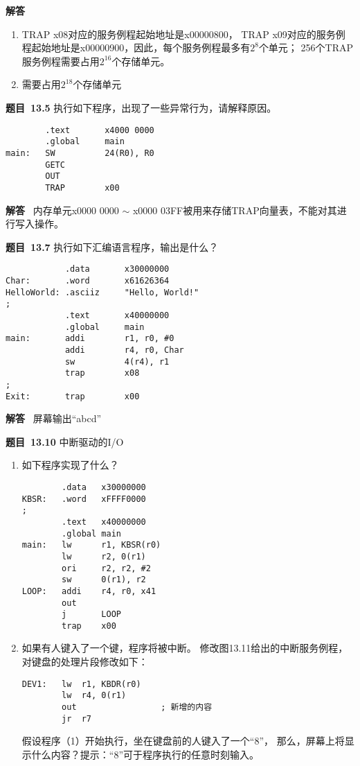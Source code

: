 \documentclass[10pt,a4paper,UTF8]{ctexart}
\newcommand{\problemname}{待定义}
\newenvironment{problem}{\begin{shaded}\par\noindent\textbf{题目\  \problemname}}{\end{shaded}\par}
\newenvironment{solution}{\par\noindent\textbf{解答}\ }{\par}
\begin{document}
\begin{solution}
	\begin{enumerate}[(1)]
		\item TRAP x08对应的服务例程起始地址是x00000800，
		TRAP x09对应的服务例程起始地址是x00000900，因此，每个服务例程最多有$2^8$个单元；
		256个TRAP服务例程需要占用$2^{16}$个存储单元。
		\item 需要占用$2^{18}$个存储单元
	\end{enumerate}
\end{solution}


\renewcommand{\problemname}{13.5}
\begin{problem}
	执行如下程序，出现了一些异常行为，请解释原因。
	\begin{lstlisting}
		.text		x4000 0000 
		.global		main 
main:	SW			24(R0), R0 
		GETC 
		OUT 
		TRAP		x00 	
	\end{lstlisting}
\end{problem}

\begin{solution}
	内存单元x0000 0000 $\sim$ x0000 03FF被用来存储TRAP向量表，不能对其进行写入操作。
\end{solution}


\renewcommand{\problemname}{13.7}
\begin{problem}
	执行如下汇编语言程序，输出是什么？
	\begin{lstlisting}
			.data		x30000000 
Char:		.word		x61626364 
HelloWorld:	.asciiz  	"Hello, World!" 
;		 
			.text		x40000000 
			.global		main 
main:		addi		r1, r0, #0 
			addi		r4, r0, Char 
			sw			4(r4), r1 
			trap		x08 
; 
Exit:		trap		x00 
	\end{lstlisting}
\end{problem}

\begin{solution}
	屏幕输出“abcd”
\end{solution}


\renewcommand{\problemname}{13.10}
\begin{problem}
	中断驱动的I/O
	\begin{enumerate}
		\item 如下程序实现了什么？
		\begin{lstlisting}
		.data	x30000000 
KBSR:	.word	xFFFF0000 
; 
		.text	x40000000 
		.global	main 
main:	lw		r1, KBSR(r0) 
		lw		r2, 0(r1) 
		ori		r2, r2, #2 
		sw		0(r1), r2 
LOOP:	addi	r4, r0, x41 
		out 
		j		LOOP 
		trap	x00 
		\end{lstlisting}
		\item 如果有人键入了一个键，程序将被中断。
		修改图13.11给出的中断服务例程，对键盘的处理片段修改如下：
		\begin{lstlisting}
DEV1:	lw	r1, KBDR(r0) 
		lw	r4, 0(r1)	 
		out					; 新增的内容
		jr	r7 
		\end{lstlisting}
		假设程序（1）开始执行，坐在键盘前的人键入了一个“8”，
		那么，屏幕上将显示什么内容？提示：“8”可于程序执行的任意时刻输入。 
	\end{enumerate}

\end{problem}
\end{document}
